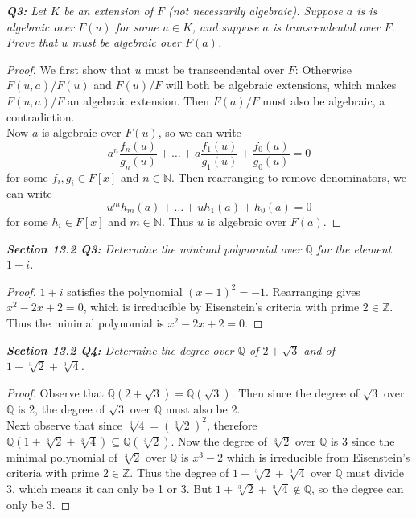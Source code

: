 \documentclass{article}
\begin{document}
\it \textbf{Q3:} Let $K$ be an extension of $F$ (not necessarily
  algebraic). Suppose $a$ is is algebraic over $F(u)$ for some $u\in K$,
  and suppose $a$ is transcendental over $F$. Prove that $u$ must be
  algebraic over $F(a)$.

  \begin{proof}
    We first show that $u$ must be transcendental over $F$: Otherwise
    $F(u,a)/F(u)$ and $F(u)/F$ will both be algebraic extensions, which
    makes $F(u,a)/F$ an algebraic extension. Then $F(a)/F$ must also be
    algebraic, a contradiction. \\

    Now $a$ is algebraic over $F(u)$, so we can write
    \[a^n\frac{f_n(u)}{g_n(u)} +\ldots +a\frac{f_1(u)}{g_1(u)}
    +\frac{f_0(u)}{g_0(u)} =0\]
    for some $f_i,g_i\in F[x]$ and $n\in\mathbb{N}$. Then rearranging to
    remove denominators, we can write
    \[u^mh_m(a) +\ldots +uh_1(a) +h_0(a)=0\]
    for some $h_i\in F[x]$ and $m\in\mathbb{N}$. Thus $u$ is algebraic over
    $F(a)$.
  \end{proof}

\it \textbf{Section 13.2 Q3:} Determine the minimal polynomial over
  $\mathbb{Q}$ for the element $1+i$.

  \begin{proof}
    $1+i$ satisfies the polynomial $(x-1)^2=-1$. Rearranging gives
    $x^2-2x+2=0$, which is irreducible by Eisenstein's criteria with prime
    $2\in\mathbb{Z}$. Thus the minimal polynomial is $x^2-2x+2=0$.
  \end{proof}

\it \textbf{Section 13.2 Q4:} Determine the degree over $\mathbb{Q}$ of
  $2+\sqrt{3}$ and of $1+\sqrt[3]{2}+\sqrt[3]{4}$.

  \begin{proof}
    Observe that $\mathbb{Q}(2+\sqrt{3}) =\mathbb{Q}(\sqrt{3})$. Then since
    the degree of $\sqrt{3}$ over $\mathbb{Q}$ is 2, the degree of
    $\sqrt{3}$ over $\mathbb{Q}$ must also be 2. \\

    Next observe that since $\sqrt[3]{4}=(\sqrt[3]{2})^2$, therefore
    $\mathbb{Q}(1+\sqrt[3]{2}+\sqrt[3]{4})\subseteq
    \mathbb{Q}(\sqrt[3]{2})$. Now the degree of $\sqrt[3]{2}$ over
    $\mathbb{Q}$ is 3 since the minimal polynomial of $\sqrt[3]{2}$ over
    $\mathbb{Q}$ is $x^3-2$ which is irreducible from Eisenstein's criteria
    with prime $2\in\mathbb{Z}$. Thus the degree of
    $1+\sqrt[3]{2}+\sqrt[3]{4}$ over $\mathbb{Q}$ must divide 3, which
    means it can only be 1 or 3. But
    $1+\sqrt[3]{2}+\sqrt[3]{4}\not\in\mathbb{Q}$, so the degree can only be
    3.
  \end{proof}
\end{document}
